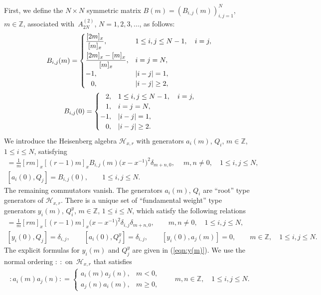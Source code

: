 \documentclass[pdftex]{sigma}
\numberwithin{equation}{section}
\begin{document}
First, we define the $N \times N$ symmetric matrix
$B(m)=(B_{i,j}(m))_{i,j=1}^N$, $m \in \mathbb{Z}$,
associated with~$A_{2N}^{(2)}$, $N=1,2,3, \dots$,
as follows:
\begin{gather*}
B_{i,j}(m)=
\begin{cases}
\dfrac{[2m]_x}{[m]_x},& 1\leq i, j \leq N-1,\quad i=j,
\\[2ex]
\dfrac{[2m]_x-[m]_x}{[m]_x}, & i=j=N,
\\
-1,& |i-j|=1,
\\
\hphantom{-}0,& |i-j|\geq 2,
\end{cases}
\\
B_{i,j}(0)=\begin{cases}
\hphantom{-}2,& 1\leq i, j \leq N-1,\quad  i=j,\\
\hphantom{-}1,& i=j=N,\\
-1,& {|i-j|=1,}\\
\hphantom{-}0,& |i-j|\geq 2.
\end{cases}
\end{gather*}
We introduce the Heisenberg algebra ${\mathcal H}_{x,r}$
with generators $a_i(m)$, $Q_i$, $m \in \mathbb{Z}$, $1\leq i \leq N$, satisfying
\begin{gather*}
[a_i(m),a_j(n)]=\frac{1}{m}[rm]_x[(r-1)m]_x
B_{i,j}(m)\big(x-x^{-1}\big)^2 \delta_{m+n,0},\quad\
m, n\neq 0, \quad 1\leq i, j \leq N,
\\
[a_i(0),Q_j]=B_{i,j}(0),\qquad 1\leq i,j \leq N.
\end{gather*}
The remaining commutators vanish. The generators $a_i(m)$, $Q_i$ are ``root'' type generators of
${\mathcal H}_{x,r}$. There is a unique set of ``fundamental weight'' type generators
$y_i(m)$, $Q_i^y$, $m \in \mathbb{Z}$, $1\leq i \leq N$, which
satisfy the following relations
\begin{gather*}
[y_i(m), a_j(n)]=\frac{1}{m}[rm]_x[(r-1)m]_x\big(x-x^{-1}\big)^2 \delta_{i,j} \delta_{m+n,0},\qquad
m, n \neq 0, \quad 1\leq i, j \leq N,
\\
[y_i(0),Q_j]=\delta_{i,j},\qquad
[a_i(0), Q_j^y]=\delta_{i,j},\qquad
[y_i(0),a_j(m)]=0,\qquad
m \in \mathbb{Z},\quad 1\leq i, j \leq N.
\end{gather*}
The explicit formulas for $y_i(m)$ and $Q_j^y$ are given in (\ref{eqn:y(m)}).
We use the normal ordering ${:}~{:}$ {on~${\mathcal H}_{x,r}$} that satisfies
\begin{gather*}
{:}a_i(m)a_j(n){:}= \begin{cases}
a_i(m)a_j(n),& m<0,
\\
a_j(n)a_i(m),& m \geq 0,
\end{cases} \qquad
m,n \in \mathbb{Z}, \quad 1\leq i, j \leq N.
\end{gather*}
\end{document}
